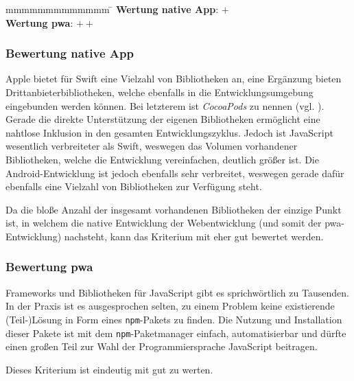 \begin{tabbing}
	mmmmmmmmmmmmm				\= \kill
	\textbf{Wertung native App}: \> $+$ \\
\textbf{Wertung \ac{pwa}}: \> $++$
\end{tabbing}

\subsubsection{Bewertung native App}
Apple bietet für Swift eine Vielzahl von Bibliotheken an, eine Ergänzung bieten Drittanbieterbibliotheken, welche ebenfalls in die Entwicklungsumgebung eingebunden werden können. Bei letzterem ist \textit{CocoaPods} zu nennen (vgl. \cite{CocoaPods}). Gerade die direkte Unterstützung der eigenen Bibliotheken ermöglicht eine nahtlose Inklusion in den gesamten Entwicklungszyklus. Jedoch ist JavaScript wesentlich verbreiteter als Swift, weswegen das Volumen vorhandener Bibliotheken, welche die Entwicklung vereinfachen, deutlich größer ist. Die Android-Entwicklung ist jedoch ebenfalls sehr verbreitet, weswegen gerade dafür ebenfalls eine Vielzahl von Bibliotheken zur Verfügung steht.

Da die bloße Anzahl der insgesamt vorhandenen Bibliotheken der einzige Punkt ist, in welchem die native Entwicklung der Webentwicklung (und somit der \ac{pwa}-Entwicklung) nachsteht, kann das Kriterium mit eher gut bewertet werden.

\subsubsection{Bewertung \ac{pwa}}
Frameworks und Bibliotheken für JavaScript gibt es sprichwörtlich zu Tausenden. In der Praxis ist es ausgesprochen selten, zu einem Problem keine existierende (Teil-)Lösung in Form eines \texttt{npm}-Pakets zu finden. Die Nutzung und Installation dieser Pakete ist mit dem \texttt{npm}-Paketmanager einfach, automatisierbar und dürfte einen großen Teil zur Wahl der Programmiersprache JavaScript beitragen.

Dieses Kriterium ist eindeutig mit gut zu werten.